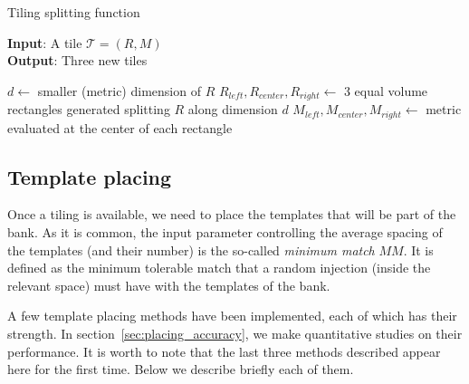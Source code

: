 \documentclass[twocolumn,showpacs,preprintnumbers,nofootinbib,prd,
superscriptaddress,10pt]{revtex4-2}
\begin{document}
\begin{algorithm}[H]
	\centering
	\caption{Tiling splitting function}\label{alg:tiling}
	\flushleft
	\hspace*{\algorithmicindent} \textbf{Input}: A tile $\mathcal{T} = \left(R, M\right)$ \\
	\hspace*{\algorithmicindent} \textbf{Output}: Three new tiles
	\begin{algorithmic}
		\State $d \gets $ smaller (metric) dimension of $R$
		\State $R_{left}, R_{center}, R_{right} \gets $ 3 equal volume rectangles generated splitting $R$ along dimension $d$ 
		\State $M_{left}, M_{center}, M_{right} \gets $ metric evaluated at the center of each rectangle
		\State{}
		\EndProcedure
	\end{algorithmic}
\end{algorithm}


\subsection{Template placing} \label{sec:template_placing}

Once a tiling is available, we need to place the templates that will be part of the bank.
As it is common, the input parameter controlling the average spacing of the templates (and their number) is the so-called {\it minimum match} $MM$. It is defined as the minimum tolerable match that a random injection (inside the relevant space) must have with the templates of the bank.

A few template placing methods have been implemented, each of which has their strength. In section~\ref{sec:placing_accuracy}, we make quantitative studies on their performance. It is worth to note that the last three methods described appear here for the first time.
Below we describe briefly each of them.
\end{document}
